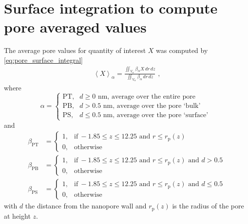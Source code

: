 \section{Surface integration to compute pore averaged values}
%

The average pore values for quantity of interest $X$ was computed by \cref{eq:pore_surface_integral}
%
\begin{align}\label{eq:pore_surface_integral}
  \left< X \right>_{\alpha} =
    \displaystyle\frac{\displaystyle\iint_{V_{\alpha}} \beta_{\alpha} X \,dr\,dz}
                      {\displaystyle\iint_{V_{\alpha}} \beta_{\alpha} \,dr\,dz}
  \text{ ,}
\end{align}
%
where
%
\begin{equation}
  \alpha=
  \begin{cases}
    \text{PT}, & d \ge 0  \text{~nm} \text{, average over the entire pore} \\
    \text{PB}, & d > 0.5  \text{~nm} \text{, average over the pore `bulk' }  \\
    \text{PS}, & d \le 0.5\text{~nm} \text{, average over the pore `surface' }
  \end{cases}
\end{equation}
%
and
%
\begin{align}
  \beta_{\text{PT}} &=
  \begin{cases}
    1, & \text{if}\ -1.85\le z \le 12.25  \text{ and } r \le r_\text{p}(z) \\
    0, & \text{otherwise}
  \end{cases} \\
  \beta_{\text{PB}} &=
  \begin{cases}
  1, & \text{if}\ -1.85\le z \le 12.25  \text{ and } r \le r_\text{p}(z) \text{ and } d > 0.5 \\
  0, & \text{otherwise}
  \end{cases} \\
  \beta_{\text{PS}} &=
  \begin{cases}
  1, & \text{if}\ -1.85\le z \le 12.25  \text{ and } r \le r_\text{p}(z) \text{ and } d \le 0.5 \\
  0, & \text{otherwise}
  \end{cases}
\end{align}
%
with $d$ the distance from the nanopore wall and $r_\text{p}(z)$ is the radius of the pore at height $z$.

\cleardoublepage

